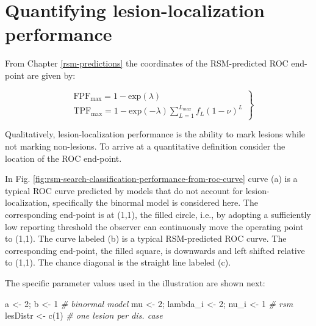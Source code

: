 \documentclass[
]{book}
\newenvironment{Shaded}{\begin{snugshade}}{\end{snugshade}}
\newcommand{\CommentTok}[1]{\textcolor[rgb]{0.56,0.35,0.01}{\textit{#1}}}
\newcommand{\DecValTok}[1]{\textcolor[rgb]{0.00,0.00,0.81}{#1}}
\newcommand{\FunctionTok}[1]{\textcolor[rgb]{0.00,0.00,0.00}{#1}}
\newcommand{\NormalTok}[1]{#1}
\newcommand{\OtherTok}[1]{\textcolor[rgb]{0.56,0.35,0.01}{#1}}
\begin{document}
\hypertarget{rsm-search-classification-quantifying}{%
\section{Quantifying lesion-localization performance}\label{rsm-search-classification-quantifying}}

From Chapter \ref{rsm-predictions} the coordinates of the RSM-predicted ROC end-point are given by:

\begin{equation}
\left. 
\begin{aligned}
&\text{FPF}_{\text{max}} = 1 - \text{exp}\left (\lambda \right ) \\
&\text{TPF}_{\text{max}} = 1 - \text{exp} \left ( - \lambda \right )\sum_{L=1}^{L_{max}}f_L \left ( 1 - \nu \right )^L
\end{aligned}
\right \}
\label{eq:rsm-search-classification-FPF-TPF-max}
\end{equation}

Qualitatively, lesion-localization performance is the ability to mark lesions while not marking non-lesions. To arrive at a quantitative definition consider the location of the ROC end-point.

In Fig. \ref{fig:rsm-search-classification-performance-from-roc-curve} curve (a) is a typical ROC curve predicted by models that do not account for lesion-localization, specifically the binormal model is considered here. The corresponding end-point is at (1,1), the filled circle, i.e., by adopting a sufficiently low reporting threshold the observer can continuously move the operating point to (1,1). The curve labeled (b) is a typical RSM-predicted ROC curve. The corresponding end-point, the filled square, is downwards and left shifted relative to (1,1). The chance diagonal is the straight line labeled (c).

The specific parameter values used in the illustration are shown next:

\begin{Shaded}
\begin{Highlighting}[]
\NormalTok{a }\OtherTok{\textless{}{-}} \DecValTok{2}\NormalTok{; b }\OtherTok{\textless{}{-}} \DecValTok{1} \CommentTok{\# binormal model}
\NormalTok{mu }\OtherTok{\textless{}{-}} \DecValTok{2}\NormalTok{; lambda\_i }\OtherTok{\textless{}{-}} \DecValTok{2}\NormalTok{; nu\_i }\OtherTok{\textless{}{-}} \DecValTok{1} \CommentTok{\# rsm}
\NormalTok{lesDistr }\OtherTok{\textless{}{-}} \FunctionTok{c}\NormalTok{(}\DecValTok{1}\NormalTok{) }\CommentTok{\# one lesion per dis. case}
\end{Highlighting}
\end{Shaded}
\end{document}
